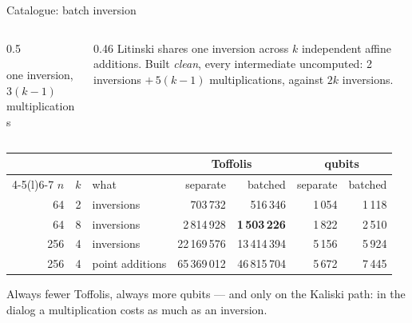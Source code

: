 \documentclass[aspectratio=169,11pt]{beamer}
\begin{document}
\begin{frame}{Catalogue: batch inversion}
  \begin{columns}[c]
    \begin{column}{0.5\textwidth}
      \centering
      \par
      {\scriptsize one inversion, $3(k-1)$ multiplications}
    \end{column}
    \begin{column}{0.46\textwidth}
      \small Litinski shares one inversion across $k$ independent affine additions. Built \emph{clean}, every intermediate uncomputed: 2 inversions $+\,5(k-1)$ multiplications, against $2k$ inversions.
    \end{column}
  \end{columns}
  \vskip2mm
  \centering\footnotesize
  \renewcommand{\arraystretch}{1.05}
  \begin{tabular}{@{}rrlrrrr@{}}
    \toprule
    & & & \multicolumn{2}{c}{Toffolis} & \multicolumn{2}{c}{qubits} \\
    \cmidrule(lr){4-5}\cmidrule(l){6-7}
    $n$ & $k$ & what & separate & batched & separate & batched \\
    \midrule
    64 & 2 & inversions & 703\,732 & 516\,346 & 1\,054 & 1\,118 \\
    64 & 8 & inversions & 2\,814\,928 & \textbf{1\,503\,226} & 1\,822 & 2\,510 \\
    256 & 4 & inversions & 22\,169\,576 & 13\,414\,394 & 5\,156 & 5\,924 \\
    256 & 4 & point additions & 65\,369\,012 & 46\,815\,704 & 5\,672 & 7\,445 \\
    \bottomrule
  \end{tabular}\par
  \vskip1mm
  \raggedright{\small Always fewer Toffolis, always more qubits --- and only on the Kaliski path: in the dialog a multiplication costs as much as an inversion.}
\end{frame}
\end{document}
